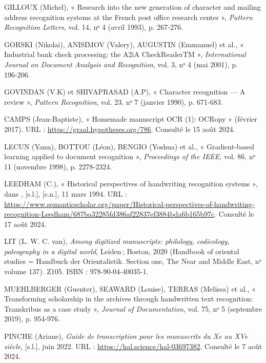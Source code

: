 \documentclass[a4paper,12pt,twoside]{book}
\begin{document}
\begin{thebibliography}{99}
		 \textsc{GILLOUX} (Michel), « Research into the new generation of character and mailing address recognition systems at the French post office research center », \emph{Pattern Recognition Letters}, vol. 14, nᵒ 4 (avril 1993), p. 267‑276.
		
		 \textsc{GORSKI} (Nikolai), \textsc{ANISIMOV} (Valery), \textsc{AUGUSTIN} (Emmanuel) et al., « Industrial bank check processing: the A2iA CheckReaderTM », \emph{International Journal on Document Analysis and Recognition}, vol. 3, nᵒ 4 (mai 2001), p. 196‑206.
		
		 \textsc{GOVINDAN} (V.K) et \textsc{SHIVAPRASAD} (A.P), « Character recognition — A review », \emph{Pattern Recognition}, vol. 23, nᵒ 7 (janvier 1990), p. 671‑683.
		
		 \textsc{CAMPS} (Jean-Baptiste), « Homemade manuscript OCR (1): OCRopy » (février 2017). URL : \url{https://graal.hypotheses.org/786}. Consulté le 15 août 2024.
		
		 \textsc{LECUN} (Yann), \textsc{BOTTOU} (Léon), \textsc{BENGIO} (Yoshua) et al., « Gradient-based learning applied to document recognition », \emph{Proceedings of the IEEE}, vol. 86, nᵒ 11 (novembre 1998), p. 2278‑2324.
		
		 \textsc{LEEDHAM} (C.), « Historical perspectives of handwriting recognition systems », dans , [s.l.], [s.n.], 11 mars 1994. URL : \url{https://www.semanticscholar.org/paper/Historical-perspectives-of-handwriting-recognition-Leedham/687ba32285fd386af22837ef3884bda6b165b97c}. Consulté le 17 août 2024.
		
		 \textsc{LIT} (L. W. C. van), \emph{Among digitized manuscripts: philology, codicology, paleography in a digital world}, Leiden ; Boston, 2020 (Handbook of oriental studies = Handbuch der Orientalistik. Section one, The Near and Middle East, nᵒ volume 137). Z105. ISBN : 978-90-04-40035-1.
		
		 \textsc{MUEHLBERGER} (Guenter), \textsc{SEAWARD} (Louise), \textsc{TERRAS} (Melissa) et al., « Transforming scholarship in the archives through handwritten text recognition: Transkribus as a case study », \emph{Journal of Documentation}, vol. 75, nᵒ 5 (septembre 2019), p. 954‑976.
		
		 \textsc{PINCHE} (Ariane), \emph{Guide de transcription pour les manuscrits du Xe au XVe siècle}, [s.l.], juin 2022. URL : \url{https://hal.science/hal-03697382}. Consulté le 7 août 2024.
		

\end{thebibliography}
\end{document}

